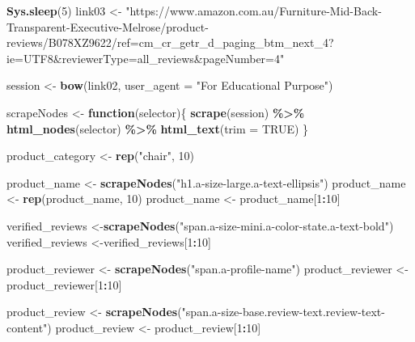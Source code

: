 \documentclass[
]{article}
\newenvironment{Shaded}{\begin{snugshade}}{\end{snugshade}}
\newcommand{\AttributeTok}[1]{\textcolor[rgb]{0.13,0.29,0.53}{#1}}
\newcommand{\ConstantTok}[1]{\textcolor[rgb]{0.56,0.35,0.01}{#1}}
\newcommand{\ControlFlowTok}[1]{\textcolor[rgb]{0.13,0.29,0.53}{\textbf{#1}}}
\newcommand{\DecValTok}[1]{\textcolor[rgb]{0.00,0.00,0.81}{#1}}
\newcommand{\FunctionTok}[1]{\textcolor[rgb]{0.13,0.29,0.53}{\textbf{#1}}}
\newcommand{\NormalTok}[1]{#1}
\newcommand{\OtherTok}[1]{\textcolor[rgb]{0.56,0.35,0.01}{#1}}
\newcommand{\SpecialCharTok}[1]{\textcolor[rgb]{0.81,0.36,0.00}{\textbf{#1}}}
\newcommand{\StringTok}[1]{\textcolor[rgb]{0.31,0.60,0.02}{#1}}
\begin{document}
\begin{Shaded}
\begin{Highlighting}[]
   \FunctionTok{Sys.sleep}\NormalTok{(}\DecValTok{5}\NormalTok{)}
\NormalTok{link03 }\OtherTok{\textless{}{-}} \StringTok{"https://www.amazon.com.au/Furniture{-}Mid{-}Back{-}Transparent{-}Executive{-}Melrose/product{-}reviews/B078XZ9622/ref=cm\_cr\_getr\_d\_paging\_btm\_next\_4?ie=UTF8\&reviewerType=all\_reviews\&pageNumber=4"}


\NormalTok{  session }\OtherTok{\textless{}{-}} \FunctionTok{bow}\NormalTok{(link02,}
               \AttributeTok{user\_agent =} \StringTok{"For Educational Purpose"}\NormalTok{)}

\NormalTok{  scrapeNodes }\OtherTok{\textless{}{-}} \ControlFlowTok{function}\NormalTok{(selector)\{}
    \FunctionTok{scrape}\NormalTok{(session) }\SpecialCharTok{\%\textgreater{}\%}
      \FunctionTok{html\_nodes}\NormalTok{(selector) }\SpecialCharTok{\%\textgreater{}\%}
      \FunctionTok{html\_text}\NormalTok{(}\AttributeTok{trim =} \ConstantTok{TRUE}\NormalTok{)}
\NormalTok{  \}}

\NormalTok{  product\_category }\OtherTok{\textless{}{-}} \FunctionTok{rep}\NormalTok{(}\StringTok{"chair"}\NormalTok{, }\DecValTok{10}\NormalTok{)}

\NormalTok{  product\_name }\OtherTok{\textless{}{-}} \FunctionTok{scrapeNodes}\NormalTok{(}\StringTok{"h1.a{-}size{-}large.a{-}text{-}ellipsis"}\NormalTok{)}
\NormalTok{  product\_name }\OtherTok{\textless{}{-}} \FunctionTok{rep}\NormalTok{(product\_name, }\DecValTok{10}\NormalTok{)}
\NormalTok{  product\_name }\OtherTok{\textless{}{-}}\NormalTok{ product\_name[}\DecValTok{1}\SpecialCharTok{:}\DecValTok{10}\NormalTok{]}
  
\NormalTok{  verified\_reviews }\OtherTok{\textless{}{-}}\FunctionTok{scrapeNodes}\NormalTok{(}\StringTok{"span.a{-}size{-}mini.a{-}color{-}state.a{-}text{-}bold"}\NormalTok{)}
\NormalTok{  verified\_reviews }\OtherTok{\textless{}{-}}\NormalTok{verified\_reviews[}\DecValTok{1}\SpecialCharTok{:}\DecValTok{10}\NormalTok{]}
  
\NormalTok{  product\_reviewer }\OtherTok{\textless{}{-}} \FunctionTok{scrapeNodes}\NormalTok{(}\StringTok{"span.a{-}profile{-}name"}\NormalTok{)}
\NormalTok{  product\_reviewer }\OtherTok{\textless{}{-}}\NormalTok{ product\_reviewer[}\DecValTok{1}\SpecialCharTok{:}\DecValTok{10}\NormalTok{]}
  
\NormalTok{  product\_review }\OtherTok{\textless{}{-}} \FunctionTok{scrapeNodes}\NormalTok{(}\StringTok{"span.a{-}size{-}base.review{-}text.review{-}text{-}content"}\NormalTok{)}
\NormalTok{  product\_review }\OtherTok{\textless{}{-}}\NormalTok{ product\_review[}\DecValTok{1}\SpecialCharTok{:}\DecValTok{10}\NormalTok{]}
  

\end{Highlighting}
\end{Shaded}
\end{document}
